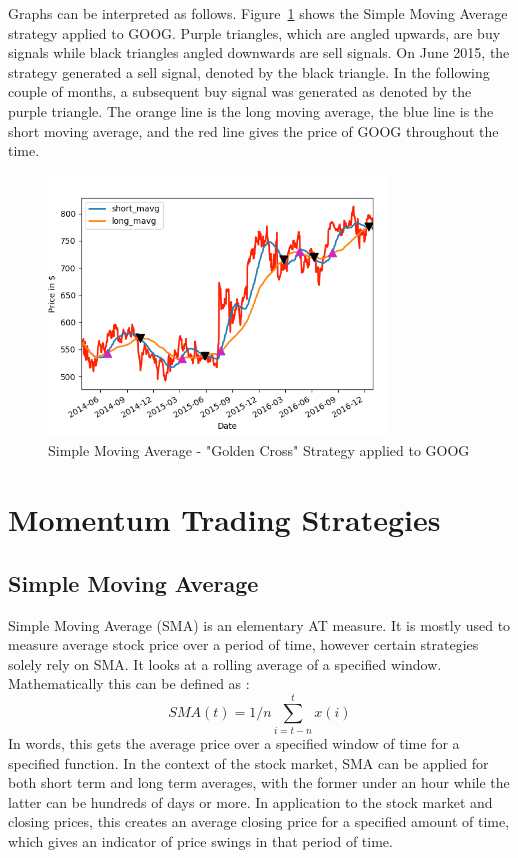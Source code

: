 \documentclass[letterpaper,11pt]{article}
\begin{document}
Graphs can be interpreted as follows. Figure~\ref{SMAfigure} shows the Simple Moving Average strategy applied to GOOG. Purple triangles, which are angled upwards, are buy signals while black triangles angled downwards are sell signals. On June 2015, the strategy generated a sell signal, denoted by the black triangle. In the following couple of months, a subsequent buy signal was generated as denoted by the purple triangle. The orange line is the long moving average, the blue line is the short moving average, and the red line gives the price of GOOG throughout the time. 

\begin{figure}[h]
\centering
\includegraphics[width=90mm]{SMA_Google.png}
\caption{Simple Moving Average - "Golden Cross" Strategy applied to GOOG \label{overflow}}
\label{SMAfigure}
\end{figure}

\FloatBarrier

\section{Momentum Trading Strategies}

\subsection{Simple Moving Average}
Simple Moving Average (SMA) is an elementary AT measure. It is mostly used to measure average stock price over a period of time, however certain strategies solely rely on SMA. It looks at a rolling average of a specified window. Mathematically this can be defined as \cite{AlmeidaTeixeira}:  \[ SMA(t) = 1/n \sum_{i=t-n}^{t}x(i) \]  In words, this gets the average price over a specified window of time for a specified function. In the context of the stock market, SMA can be applied for both short term and long term averages, with the former under an hour while the latter can be hundreds of days or more. In application to the stock market and closing prices, this creates an average closing price for a specified amount of time, which gives an indicator of price swings in that period of time.
\end{document}
